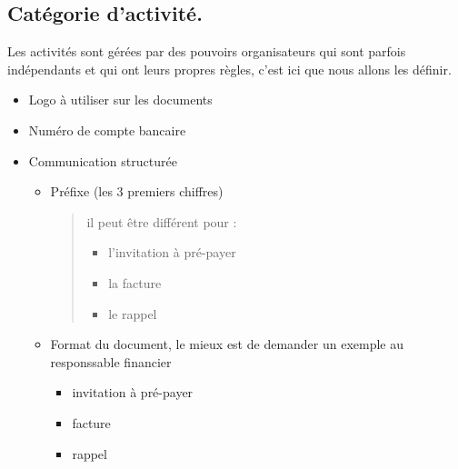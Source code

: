 \documentclass[letterpaper,10pt,english]{sphinxmanual}
\begin{document}
\subsection{Catégorie d'activité.}
\label{checklist:categorie-d-activite}
Les activités sont gérées par des pouvoirs organisateurs qui sont parfois indépendants et qui ont leurs propres règles,
c'est ici que nous allons les définir.
\begin{itemize}
\item {} 
Logo à utiliser sur les documents

\item {} 
Numéro de compte bancaire

\item {} 
Communication structurée
\begin{itemize}
\item {} 
Préfixe (les 3 premiers chiffres)
\begin{quote}

il peut être différent pour :
\begin{itemize}
\item {} 
l'invitation à pré-payer

\item {} 
la facture

\item {} 
le rappel

\end{itemize}
\end{quote}

\item {} 
Format du document, le mieux est de demander un exemple au responssable financier
\begin{itemize}
\item {} 
invitation à pré-payer

\item {} 
facture

\item {} 
rappel

\end{itemize}

\end{itemize}

\end{itemize}
\end{document}
